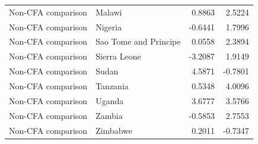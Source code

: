 \begin{table}
\begin{tabular}[t]{llrr}
Non-CFA comparison & Malawi & 0.8863 & 2.5224\\
Non-CFA comparison & Nigeria & -0.6441 & 1.7996\\
Non-CFA comparison & Sao Tome and Principe & 0.0558 & 2.3894\\
Non-CFA comparison & Sierra Leone & -3.2087 & 1.9149\\
\addlinespace
Non-CFA comparison & Sudan & 4.5871 & -0.7801\\
Non-CFA comparison & Tanzania & 0.5348 & 4.0096\\
Non-CFA comparison & Uganda & 3.6777 & 3.5766\\
Non-CFA comparison & Zambia & -0.5853 & 2.7553\\
Non-CFA comparison & Zimbabwe & 0.2011 & -0.7347\\
\bottomrule
\end{tabular}
\end{table}
